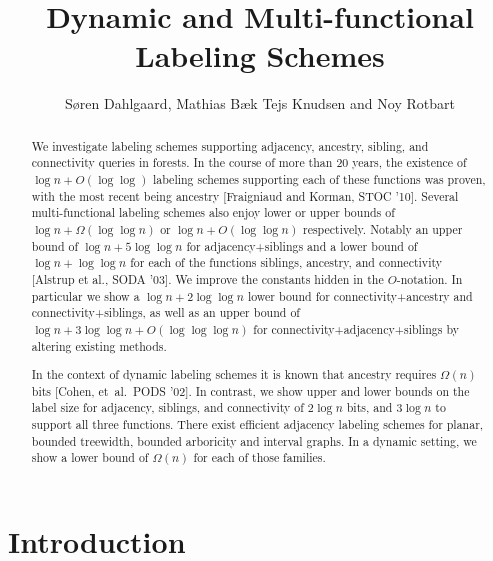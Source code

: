\documentclass{llncs}
\begin{document}
\title{Dynamic and Multi-functional Labeling Schemes}



\author{S\o ren Dahlgaard, Mathias B\ae k Tejs Knudsen and Noy Rotbart }


\maketitle

\begin{abstract}
We investigate labeling schemes supporting  adjacency, ancestry, sibling,
and connectivity queries  in forests. 
In the course of more than 20 years, the existence of $\log n + O(\log \log)$  labeling schemes supporting each of these  functions was proven, with the most recent being ancestry [Fraigniaud and Korman, STOC '10].
Several multi-functional labeling schemes also enjoy lower or upper bounds of
$\log n + \Omega(\log \log n)$ or $\log n + O(\log \log n)$ respectively.
Notably an upper bound of $\log n + 5\log \log n$ for adjacency+siblings
and a lower bound of $\log n + \log \log n$ for each of the functions siblings, ancestry, and
connectivity [Alstrup et al., SODA '03].
We improve the constants hidden in the $O$-notation. In particular we show a
$\log n + 2\log \log n$ lower bound for connectivity+ancestry 
and connectivity+siblings, as well as an upper bound of
$\log n + 3\log \log n + O(\log \log \log n)$ for connectivity+adjacency+siblings
by altering existing methods.

In the context of dynamic labeling schemes it is known that
ancestry requires $\Omega(n)$ bits [Cohen, et~al.~PODS '02]. 
In contrast, we show upper and lower bounds on the label size for adjacency, siblings, and
connectivity of $2\log n$ bits, and $3 \log n$  to support all three functions.
There exist efficient adjacency labeling schemes for planar, bounded treewidth, bounded arboricity and interval graphs.
In a dynamic setting, we show a lower bound of  $\Omega(n)$ for each of those families.
\end{abstract}

\section{Introduction}\label{sec:intro}
\end{document}
